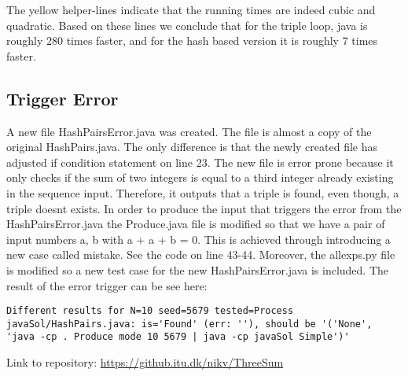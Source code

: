 \documentclass[nobib]{tufte-handout}
\begin{document}
The yellow helper-lines indicate that the running times are indeed cubic and quadratic.
Based on these lines we conclude that for the triple loop, java is roughly 280 times faster,
and for the hash based version it is roughly 7 times faster.

\subsection{Trigger Error}
A new file HashPairsError.java was created. The file is almost a copy of the original HashPairs.java.
The only difference is that the newly created file has adjusted if condition statement on line 23. The new file is error prone
because it only checks if the sum of two integers is equal to a third integer already existing in the sequence input. 
Therefore, it outputs that a triple is found, even though, a triple doesnt exists.
In order to produce the input that triggers the error from the HashPairsError.java the Produce.java file is modified so that
we have a pair of input numbers a, b with a + a + b = 0. This is achieved through introducing a new case called mistake. See the code on line 43-44.
Moreover, the allexps.py file is modified so a new test case for the new HashPairsError.java is included.
The result of the error trigger can be see here:
\begin{verbatim} 
Different results for N=10 seed=5679 tested=Process javaSol/HashPairs.java: is='Found' (err: ''), should be '('None', 'java -cp . Produce mode 10 5679 | java -cp javaSol Simple')'
\end{verbatim}
Link to repository: \url{https://github.itu.dk/nikv/ThreeSum}
\end{document}
